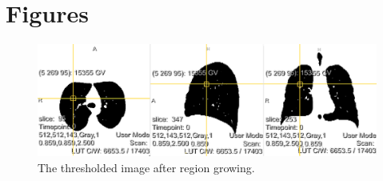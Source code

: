 \documentclass[a4paper,10pt]{article}
\numberwithin{equation}{section} %
\numberwithin{figure}{section} %
\numberwithin{table}{section} %
\begin{document}
\section{Figures}

\begin{figure}[h]
	\centering
	\includegraphics[width=\textwidth]{regiongrowing}
    \caption{The thresholded image after region growing.}
    \label{fig:reg-gro}
\end{figure}
\end{document}
